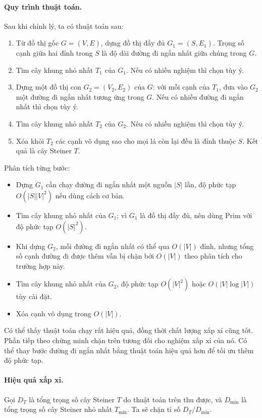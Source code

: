\documentclass[11pt]{article}
\begin{document}
\paragraph{Quy trình thuật toán.}
Sau khi chỉnh lý, ta có thuật toán sau:
\begin{enumerate}
  \item Từ đồ thị gốc \(G=(V,E)\), dựng đồ thị đầy đủ
  \(G_1=(S,E_1)\). Trọng số cạnh giữa hai đỉnh trong \(S\) là độ dài đường đi
  ngắn nhất giữa chúng trong \(G\).
  \item Tìm cây khung nhỏ nhất \(T_1\) của \(G_1\). Nếu có nhiều nghiệm thì chọn
  tùy ý.
  \item Dựng một đồ thị con \(G_2=(V_2,E_2)\) của \(G\): với mỗi cạnh của \(T_1\),
  đưa vào \(G_2\) một đường đi ngắn nhất tương ứng trong \(G\). Nếu có nhiều
  đường đi ngắn nhất thì chọn tùy ý.
  \item Tìm cây khung nhỏ nhất \(T_2\) của \(G_2\). Nếu có nhiều nghiệm thì chọn
  tùy ý.
  \item Xóa khỏi \(T_2\) các cạnh vô dụng sao cho mọi lá còn lại đều là đỉnh
  thuộc \(S\). Kết quả là cây Steiner \(T\).
\end{enumerate}

Phân tích từng bước:
\begin{itemize}
  \item Dựng \(G_1\) cần chạy đường đi ngắn nhất một nguồn \(|S|\) lần, độ phức
  tạp \(O(|S||V|^2)\) nếu dùng cách cơ bản.
  \item Tìm cây khung nhỏ nhất của \(G_1\); vì \(G_1\) là đồ thị đầy đủ, nên dùng
  Prim với độ phức tạp \(O(|S|^2)\).
  \item Khi dựng \(G_2\), mỗi đường đi ngắn nhất có thể qua \(O(|V|)\) đỉnh,
  nhưng tổng số cạnh đường đi được thêm vẫn bị chặn bởi \(O(|V|)\) theo phân
  tích cho trường hợp này.
  \item Tìm cây khung nhỏ nhất của \(G_2\), độ phức tạp \(O(|V|^2)\) hoặc
  \(O(|V|\log |V|)\) tùy cài đặt.
  \item Xóa cạnh vô dụng trong \(O(|V|)\).
\end{itemize}

Có thể thấy thuật toán chạy rất hiệu quả, đồng thời chất lượng xấp xỉ cũng tốt.
Phần tiếp theo chứng minh chặn trên tương đối cho nghiệm xấp xỉ của nó. Có thể
thay bước đường đi ngắn nhất bằng thuật toán hiệu quả hơn để tối ưu thêm độ
phức tạp.

\paragraph{Hiệu quả xấp xỉ.}
Gọi \(D_T\) là tổng trọng số cây Steiner \(T\) do thuật toán trên thu được, và
\(D_{\min}\) là tổng trọng số cây Steiner nhỏ nhất \(T_{\min}\). Ta sẽ chặn
tỉ số \(D_T/D_{\min}\).
\end{document}
